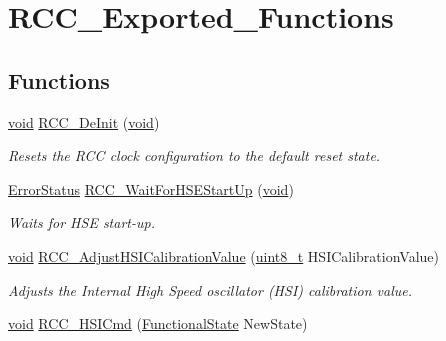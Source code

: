 \hypertarget{group___r_c_c___exported___functions}{}\section{R\+C\+C\+\_\+\+Exported\+\_\+\+Functions}
\label{group___r_c_c___exported___functions}
\subsection*{Functions}
\begin{DoxyCompactItemize}
\item 
\hyperlink{usb__devapi_8h_afabf60e7f57651d6d595a02c75f07cd0}{void} \hyperlink{group___r_c_c___exported___functions_ga413f6422be11b1334abe60b3bff2e062}{R\+C\+C\+\_\+\+De\+Init} (\hyperlink{usb__devapi_8h_afabf60e7f57651d6d595a02c75f07cd0}{void})
\begin{DoxyCompactList}\small\item\em Resets the R\+CC clock configuration to the default reset state. \end{DoxyCompactList}\item 
\hyperlink{agilefox_2library_2inc_2stm32f10x__type_8h_a8333b96c67f83cba354b3407fcbb6ee8}{Error\+Status} \hyperlink{group___r_c_c___exported___functions_gae0f15692614dd048ee4110a056f001dc}{R\+C\+C\+\_\+\+Wait\+For\+H\+S\+E\+Start\+Up} (\hyperlink{usb__devapi_8h_afabf60e7f57651d6d595a02c75f07cd0}{void})
\begin{DoxyCompactList}\small\item\em Waits for H\+SE start-\/up. \end{DoxyCompactList}\item 
\hyperlink{usb__devapi_8h_afabf60e7f57651d6d595a02c75f07cd0}{void} \hyperlink{group___r_c_c___exported___functions_gaa2d6a35f5c2e0f86317c3beb222677fc}{R\+C\+C\+\_\+\+Adjust\+H\+S\+I\+Calibration\+Value} (\hyperlink{_p_e___types_8h_aba7bc1797add20fe3efdf37ced1182c5}{uint8\+\_\+t} H\+S\+I\+Calibration\+Value)
\begin{DoxyCompactList}\small\item\em Adjusts the Internal High Speed oscillator (H\+SI) calibration value. \end{DoxyCompactList}\item 
\hyperlink{usb__devapi_8h_afabf60e7f57651d6d595a02c75f07cd0}{void} \hyperlink{group___r_c_c___exported___functions_ga0c6772a1e43765909495f57815ef69e2}{R\+C\+C\+\_\+\+H\+S\+I\+Cmd} (\hyperlink{agilefox_2library_2inc_2stm32f10x__type_8h_ac9a7e9a35d2513ec15c3b537aaa4fba1}{Functional\+State} New\+State)

\end{DoxyCompactItemize}
